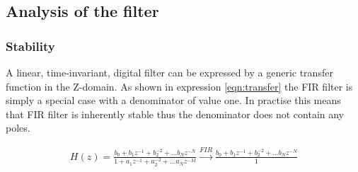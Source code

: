 
\subsection{Analysis of the filter}

\subsubsection{Stability}
A linear, time-invariant, digital filter can be expressed by a generic transfer function in the Z-domain. As shown in expression \cref{eqn:transfer} the FIR filter is simply a special case with a denominator of value one. In practise this means that FIR filter is inherently stable thus the denominator does not contain any poles.

\begin{align}
H(z)=\frac{b_0+b_1z^{-1}+b_2^{-2}+...b_Nz^{-N}}{1+a_1z^{-1}+a_2^{-2}+...a_Nz^{-M}} \xrightarrow[]{FIR}  \frac{b_0+b_1z^{-1}+b_2^{-2}+...b_Nz^{-N}}{1}
\label{eqn:transfer}
\end{align}
